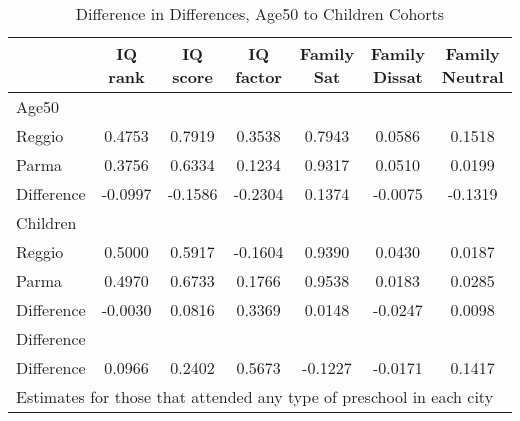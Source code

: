\begin{table}[htbp]\centering
\caption{Difference in Differences, Age50 to Children Cohorts}
\begin{tabular}{l*{6}{c}}
\hline\hline
            &     IQ rank&    IQ score&   IQ factor&  Family Sat&Family Dissat&Family Neutral\\
\hline
Age50       &            &            &            &            &            &            \\
Reggio      &      0.4753&      0.7919&      0.3538&      0.7943&      0.0586&      0.1518\\
Parma       &      0.3756&      0.6334&      0.1234&      0.9317&      0.0510&      0.0199\\
Difference  &     -0.0997&     -0.1586&     -0.2304&      0.1374&     -0.0075&     -0.1319\\
\hline
Children    &            &            &            &            &            &            \\
Reggio      &      0.5000&      0.5917&     -0.1604&      0.9390&      0.0430&      0.0187\\
Parma       &      0.4970&      0.6733&      0.1766&      0.9538&      0.0183&      0.0285\\
Difference  &     -0.0030&      0.0816&      0.3369&      0.0148&     -0.0247&      0.0098\\
\hline
Difference  &            &            &            &            &            &            \\
Difference  &      0.0966&      0.2402&      0.5673&     -0.1227&     -0.0171&      0.1417\\
\hline\hline
\multicolumn{7}{l}{\footnotesize Estimates for those that attended any type of preschool in each city}\\
\end{tabular}
\end{table}
